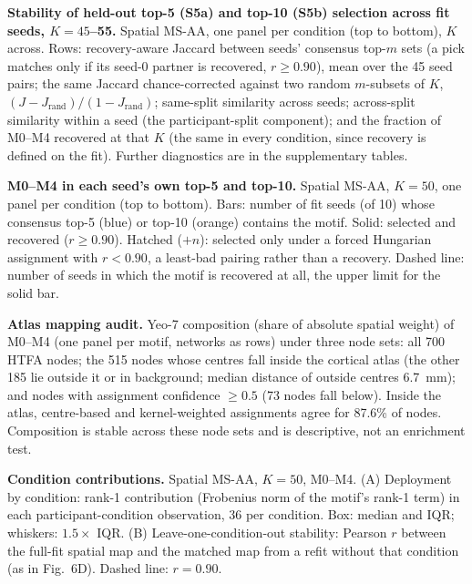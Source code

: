 \caption{\textbf{Stability of held-out top-5 (S5a) and top-10 (S5b) selection across fit seeds, $K = 45$--55.}
Spatial MS-AA, one panel per condition (top to bottom), $K$ across. Rows: recovery-aware Jaccard between seeds' consensus top-$m$ sets (a pick matches only if its seed-0 partner is recovered, $r \geq 0.90$), mean over the 45 seed pairs; the same Jaccard chance-corrected against two random $m$-subsets of $K$, $(J - J_{\text{rand}}) / (1 - J_{\text{rand}})$; same-split similarity across seeds; across-split similarity within a seed (the participant-split component); and the fraction of M0--M4 recovered at that $K$ (the same in every condition, since recovery is defined on the fit). Further diagnostics are in the supplementary tables.}
\label{fig:s05}

\caption{\textbf{M0--M4 in each seed's own top-5 and top-10.}
Spatial MS-AA, $K = 50$, one panel per condition (top to bottom). Bars: number of fit seeds (of 10) whose consensus top-5 (blue) or top-10 (orange) contains the motif. Solid: selected and recovered ($r \geq 0.90$). Hatched ($+n$): selected only under a forced Hungarian assignment with $r < 0.90$, a least-bad pairing rather than a recovery. Dashed line: number of seeds in which the motif is recovered at all, the upper limit for the solid bar.}
\label{fig:s06}

\caption{\textbf{Atlas mapping audit.}
Yeo-7 composition (share of absolute spatial weight) of M0--M4 (one panel per motif, networks as rows) under three node sets: all 700 HTFA nodes; the 515 nodes whose centres fall inside the cortical atlas (the other 185 lie outside it or in background; median distance of outside centres 6.7~mm); and nodes with assignment confidence $\geq 0.5$ (73 nodes fall below). Inside the atlas, centre-based and kernel-weighted assignments agree for 87.6\% of nodes. Composition is stable across these node sets and is descriptive, not an enrichment test.}
\label{fig:s07}

\caption{\textbf{Condition contributions.}
Spatial MS-AA, $K = 50$, M0--M4. (A) Deployment by condition: rank-1 contribution (Frobenius norm of the motif's rank-1 term) in each participant-condition observation, 36 per condition. Box: median and IQR; whiskers: $1.5 \times$ IQR. (B) Leave-one-condition-out stability: Pearson $r$ between the full-fit spatial map and the matched map from a refit without that condition (as in Fig.~6D). Dashed line: $r = 0.90$.}
\label{fig:s08}

